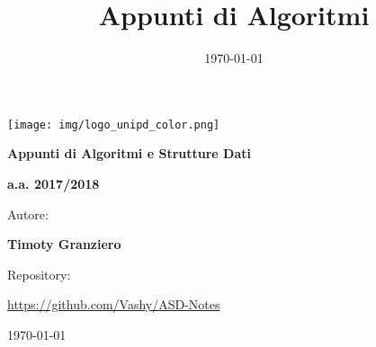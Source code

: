 \documentclass[12pt,a4paper]{article}
\author{\authorName}
\date{\today}
\title{Appunti di Algoritmi}
\newcommand{\authorName}{Timoty Granziero}
\begin{document}
\begin{titlepage}
	\centering
	\texttt{[image: img/logo\_unipd\_color.png]}\par\vspace{1cm} %
	
	{\LARGE\bfseries Appunti di Algoritmi e Strutture Dati \par}
	\vspace{1cm}
	
	{\Large\bfseries a.a. 2017/2018 \par}
	
	\vspace{1cm} 

	Autore: \par
	{\bfseries \authorName \par}
	
	\vspace{1cm}

	Repository: \par
	\url{https://github.com/Vashy/ASD-Notes}
    
    \vfill
	
	{\large \today\par}
	
\end{titlepage}

\newpage
\tableofcontents

\frenchspacing

\newpage

 \newpage
 




\end{document}
